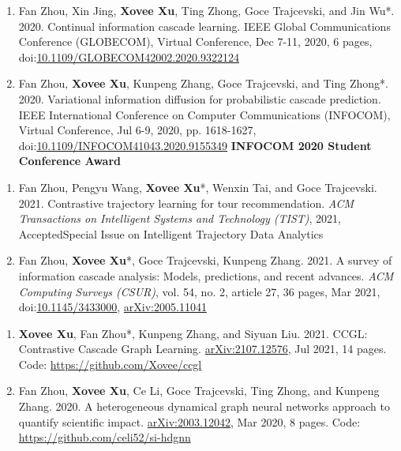 \begin{enumerate}[resume]
    \item Fan Zhou, Xin Jing, \textbf{Xovee Xu}, Ting Zhong, Goce Trajcevski, and Jin Wu*. 2020. Continual information cascade learning. IEEE Global Communications Conference (GLOBECOM), Virtual Conference, Dec 7-11, 2020, 6 pages, doi:\href{https://doi.org/10.1109/GLOBECOM42002.2020.9322124}{10.1109/GLOBECOM42002.2020.9322124}
    \item Fan Zhou, \textbf{Xovee Xu}, Kunpeng Zhang, Goce Trajcevski, and Ting Zhong*. 2020. Variational information diffusion for probabilistic cascade prediction. IEEE International Conference on Computer Communications (INFOCOM), Virtual Conference, Jul 6-9, 2020, pp. 1618-1627, doi:\href{https://doi.org/10.1109/INFOCOM41043.2020.9155349}{10.1109/INFOCOM41043.2020.9155349}
    \newline \textbf{\color{red}INFOCOM 2020 Student Conference Award}
\end{enumerate}


\begin{enumerate}[resume]
    \item Fan Zhou, Pengyu Wang, \textbf{Xovee Xu}*, Wenxin Tai, and Goce Trajcevski. 2021. Contrastive trajectory learning for tour recommendation. \textit{ACM Transactions on Intelligent Systems and Technology (TIST)}, 2021, Accepted\newline Special Issue on Intelligent Trajectory Data Analytics
    \item Fan Zhou, \textbf{Xovee Xu}*, Goce Trajcevski, Kunpeng Zhang. 2021. A survey of information cascade analysis: Models, predictions, and recent advances. \textit{ACM Computing Surveys (CSUR)}, vol. 54, no. 2, article 27, 36 pages, Mar 2021, doi:\href{https://xovee.cn/html/paper-redirects/csur2021.html}{10.1145/3433000}, \href{https://arxiv.org/abs/2005.11041}{arXiv:2005.11041}
\end{enumerate}


\begin{enumerate}[resume]
    \item \textbf{Xovee Xu}, Fan Zhou*, Kunpeng Zhang, and Siyuan Liu. 2021. CCGL: Contrastive Cascade Graph Learning. \href{https://arxiv.org/abs/2107.12576}{arXiv:2107.12576}, Jul 2021, 14 pages. \newline Code: {\color{gray}\url{https://github.com/Xovee/ccgl}}
    \item Fan Zhou, \textbf{Xovee Xu}, Ce Li, Goce Trajcevski, Ting Zhong, and Kunpeng Zhang. 2020. A heterogeneous dynamical graph neural networks approach to quantify scientific impact. \href{https://arxiv.org/abs/2003.12042}{arXiv:2003.12042}, Mar 2020, 8 pages. \newline Code: {\color{gray}\url{https://github.com/celi52/si-hdgnn}}
\end{enumerate}

